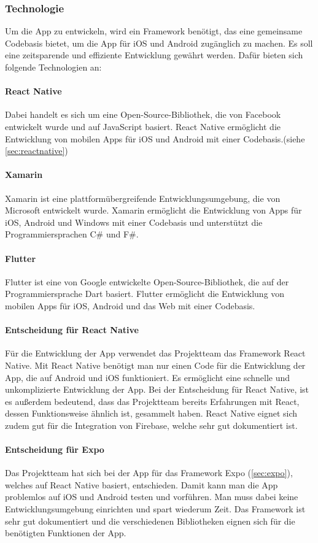 \subsubsection{Technologie}
Um die App zu entwickeln, wird ein \Gls{Framework} benötigt, das eine gemeinsame Codebasis bietet, um die App für iOS und Android zugänglich zu machen. Es soll eine zeitsparende und effiziente Entwicklung gewährt werden. Dafür bieten sich folgende Technologien an:

\paragraph{React Native}
Dabei handelt es sich um eine \Gls{Open-Source}-Bibliothek, die von Facebook entwickelt wurde und auf JavaScript basiert. React Native ermöglicht die Entwicklung von mobilen Apps für iOS und Android mit einer Codebasis.(siehe \ref{sec:reactnative})

\paragraph{Xamarin}
Xamarin ist eine plattformübergreifende Entwicklungsumgebung, die von Microsoft entwickelt wurde. Xamarin ermöglicht die Entwicklung von Apps für iOS, Android und Windows mit einer Codebasis und unterstützt die Programmiersprachen C\# und F\#. 

\paragraph{Flutter}
Flutter ist eine von Google entwickelte \Gls{Open-Source}-Bibliothek, die auf der Programmiersprache Dart basiert. Flutter ermöglicht die Entwicklung von mobilen Apps für iOS, Android und das Web mit einer Codebasis. 

\paragraph{Entscheidung für React Native}
Für die Entwicklung der App verwendet das Projektteam das \Gls{Framework} React Native. Mit React Native benötigt man nur einen Code für die Entwicklung der App, die auf Android und iOS funktioniert. Es ermöglicht eine schnelle und unkomplizierte Entwicklung der App. Bei der Entscheidung für React Native, ist es außerdem bedeutend, dass das Projektteam bereits Erfahrungen mit React, dessen Funktionsweise ähnlich ist, gesammelt haben. React Native eignet sich zudem gut für die Integration von Firebase, welche sehr gut dokumentiert ist. 

\paragraph{Entscheidung für Expo}
Das Projektteam hat sich bei der App für das \Gls{Framework} Expo (\ref{sec:expo}), welches auf React Native basiert, entschieden. Damit kann man die App problemlos auf iOS und Android testen und vorführen. Man muss dabei keine Entwicklungsumgebung einrichten und spart wiederum Zeit. Das \Gls{Framework} ist sehr gut dokumentiert und die verschiedenen Bibliotheken eignen sich für die benötigten Funktionen der App.
